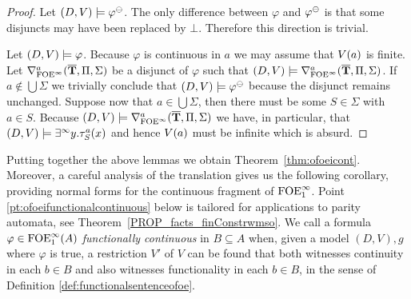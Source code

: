 \begin{proof}
\bigskip
\noindent\fbox{$\Leftarrow$} Let $(D,\val) \models \varphi^\tcont$. The only difference between $\varphi$ and $\varphi^\tcont$ is that some disjuncts may have been replaced by $\bot$. Therefore this direction is trivial.

\bigskip
\noindent\fbox{$\Rightarrow$} Let $(D,\val) \models \varphi$. Because $\varphi$ is continuous in $a$ we may assume that $\val(a)$ is finite. Let $\mondbnfofoei{\vlist{T}}{\Pi}{\Sigma}{a}$ be a disjunct of $\varphi$ such that $(D,\val) \models \mondbnfofoei{\vlist{T}}{\Pi}{\Sigma}{a}$. If $a \notin \bigcup\Sigma$ we trivially conclude that $(D,\val) \models \varphi^\tcont$ because the disjunct remains unchanged. Suppose now that $a\in \bigcup\Sigma$, then there must be some $S\in\Sigma$ with $a\in S$. Because $(D,\val) \models \mondbnfofoei{\vlist{T}}{\Pi}{\Sigma}{a}$ we have, in particular, that $(D,\val) \models \qu y.\tau^a_S(x)$ and hence $\val(a)$ must be infinite which is absurd.
\end{proof}

Putting together the above lemmas we obtain Theorem~\ref{thm:ofoeicont}. Moreover, a careful analysis of the translation gives us the following corollary, providing normal forms for the continuous fragment of $\ofoei$. Point \ref{pt:ofoeifunctionalcontinuous} below is tailored for applications to parity automata, see Theorem~\ref{PROP_facts_finConstrwmso}. We call a formula $\varphi  \in \ofoei(A)$ \emph{functionally continuous} in $B \subseteq A$ when, given a model $(D,V),g$ where $\varphi$ is true, a restriction $V'$ of $V$ can be found that both witnesses continuity in each $b \in B$ and also witnesses functionality in each $b \in B$, in the sense of Definition \ref{def:functionalsentenceofoe}.

